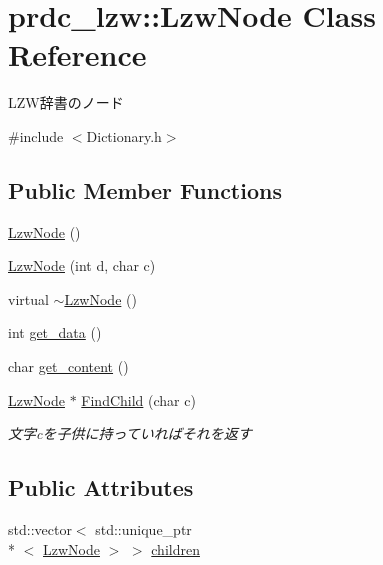 \hypertarget{classprdc__lzw_1_1LzwNode}{\section{prdc\-\_\-lzw\-:\-:Lzw\-Node Class Reference}
\label{classprdc__lzw_1_1LzwNode}
}


L\-Z\-W辞書のノード  




{\ttfamily \#include $<$Dictionary.\-h$>$}

\subsection*{Public Member Functions}
\begin{DoxyCompactItemize}
\item 
\hyperlink{classprdc__lzw_1_1LzwNode_aecd8429cfcb52da0c5a88c2eb2ce8f17}{Lzw\-Node} ()
\item 
\hyperlink{classprdc__lzw_1_1LzwNode_ab376216cc0c3c4893de9cc82e193bc0a}{Lzw\-Node} (int d, char c)
\item 
virtual \hyperlink{classprdc__lzw_1_1LzwNode_ab7c9e93839328025287d465734dfba4a}{$\sim$\-Lzw\-Node} ()
\item 
int \hyperlink{classprdc__lzw_1_1LzwNode_a43acbf6c83a319186feb5ff239e6714d}{get\-\_\-data} ()
\item 
char \hyperlink{classprdc__lzw_1_1LzwNode_afb7e80f3c9f742548fa9e82b4236ae36}{get\-\_\-content} ()
\item 
\hyperlink{classprdc__lzw_1_1LzwNode}{Lzw\-Node} $\ast$ \hyperlink{classprdc__lzw_1_1LzwNode_a4dbccb5fb97eae6f622a66a53eda46a3}{Find\-Child} (char c)
\begin{DoxyCompactList}\small\item\em 文字cを子供に持っていればそれを返す \end{DoxyCompactList}\end{DoxyCompactItemize}
\subsection*{Public Attributes}
\begin{DoxyCompactItemize}
\item 
std\-::vector$<$ std\-::unique\-\_\-ptr\\*
$<$ \hyperlink{classprdc__lzw_1_1LzwNode}{Lzw\-Node} $>$ $>$ \hyperlink{classprdc__lzw_1_1LzwNode_aa2a491ab33b89986e6086bdf0e48a4d3}{children}
\end{DoxyCompactItemize}

